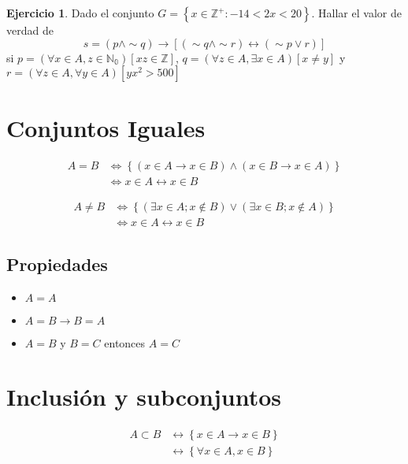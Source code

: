 \documentclass[
  16pt,
]{krantz}
\providecommand{\tightlist}{%
  \setlength{\itemsep}{0pt}\setlength{\parskip}{0pt}}
\theoremstyle{definition}
\theoremstyle{definition}
\theoremstyle{definition}
\newtheorem{exercise}{Ejercicio}[chapter]
\theoremstyle{definition}
\theoremstyle{remark}
\begin{document}
\begin{exercise}
\protect\hypertarget{exr:unnamed-chunk-6}{}{\label{exr:unnamed-chunk-6} }Dado el conjunto \(G=\left\{x\in\mathbb{Z}^+:-14<2x<20\right\}\). Hallar el valor de verdad de \[
s=(p\wedge \sim q)\rightarrow[(\sim q\wedge \sim r)\leftrightarrow(\sim p\vee r)] 
\] si \(p=(\forall x\in A, z\in \mathbb{N_0})[xz\in \mathbb{Z}]\), \(q=(\forall z\in A, \exists x \in A)[x\neq y]\) y \(r=(\forall z\in A, \forall y \in A)[yx^2>500]\)
\end{exercise}

\hypertarget{conjuntos-iguales}{%
\section{Conjuntos Iguales}\label{conjuntos-iguales}}

\[\begin{aligned}A=B&\Longleftrightarrow \left\{(x\in A\rightarrow x\in B)\wedge(x\in B\rightarrow x\in A)\right\}\\
&\Longleftrightarrow x\in A \leftrightarrow x\in B 
\end{aligned}\]

\[\begin{aligned}A\neq B&\Longleftrightarrow \left\{(\exists x\in A; x\notin B)\vee(\exists x\in B; x\notin A)\right\}\\
&\Longleftrightarrow x\in A \leftrightarrow x\in B 
\end{aligned}\]

\hypertarget{propiedades}{%
\subsection{Propiedades}\label{propiedades}}

\begin{itemize}
\tightlist
\item
  \(A=A\)
\item
  \(A=B\rightarrow B=A\)
\item
  \(A=B\) y \(B=C\) entonces \(A=C\)
\end{itemize}

\hypertarget{inclusiuxf3n-y-subconjuntos}{%
\section{Inclusión y subconjuntos}\label{inclusiuxf3n-y-subconjuntos}}

\[
\begin{aligned}
A\subset B&\leftrightarrow\left\{x\in A\rightarrow x\in B\right\}\\
&\leftrightarrow\left\{\forall x\in A, x\in B\right\}
\end{aligned}
\]
\end{document}
